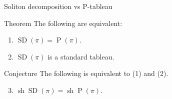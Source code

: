 \documentclass[aspectratio=169, serif]{beamer}
\DeclareMathOperator{\SD}{SD}
\DeclareMathOperator{\Pt}{P}
\DeclareMathOperator{\sh}{sh}
\begin{document}
\begin{frame}{Soliton decomposition vs P-tableau}
    
     \begin{alertblock}{Theorem}
        The following are equivalent: \begin{enumerate}
            \item $\SD(\pi) = \Pt(\pi).$
            \item $\SD(\pi)$ is a standard tableau.
        \end{enumerate}
    \end{alertblock}
    \begin{block}{Conjecture}
        The following is equivalent to (1) and (2).
        \begin{enumerate}
            \setcounter{enumi}{2}
            \item $\sh\SD(\pi) = \sh\Pt(\pi).$ 
        \end{enumerate}
    \end{block}
\end{frame}
\end{document}
